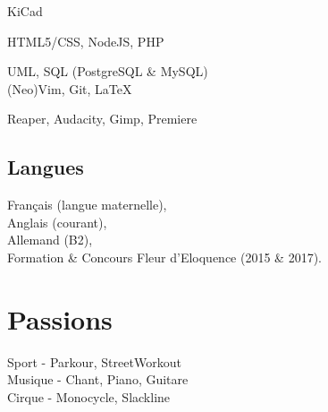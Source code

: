 \documentclass[]{cv-template}
\begin{document}
\begin{minipage}[t]{0.34\textwidth}
KiCad

HTML5/CSS, NodeJS, PHP

UML, SQL (PostgreSQL \& MySQL)\\

(Neo)Vim, Git, \LaTeX

Reaper, Audacity, Gimp, Premiere

\sectionsep
\subsection{Langues}
\faCaretRight  Français (langue maternelle), \\
\faCaretRight  Anglais (courant), \\
\faCaretRight  Allemand (B2),\\

\faCaretRight  Formation \& Concours Fleur d'Eloquence (2015 \& 2017).
\sectionsep



\section{Passions}
Sport - Parkour, StreetWorkout \\
Musique - Chant, Piano, Guitare\\
Cirque - Monocycle, Slackline
\sectionsep



\end{minipage}
\end{document}
